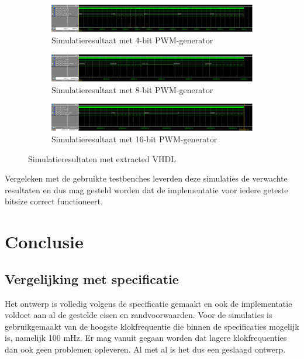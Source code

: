 \documentclass{article}
\begin{document}
\begin{figure}[H]
	\centering
	\begin{subfigure}{\textwidth}
		\includegraphics[width=\textwidth]{resource/pwm_gen_sim_4bit.png}
		\caption{Simulatieresultaat met 4-bit PWM-generator}
		\label{sfig:pwm-sim-4bit}
	\end{subfigure}
	\newline
	\begin{subfigure}{\textwidth}
		\includegraphics[width=\textwidth]{resource/pwm_gen_sim_8bit.png}
		\caption{Simulatieresultaat met 8-bit PWM-generator}
		\label{sfig:pwm-sim-8bit}
	\end{subfigure}
	\newline
	\begin{subfigure}{\textwidth}
		\includegraphics[width=\textwidth]{resource/pwm_gen_sim_16bit.png}
		\caption{Simulatieresultaat met 16-bit PWM-generator}
		\label{sfig:pwm-sim-16bit}
	\end{subfigure}
	\caption{Simulatieresultaten met extracted VHDL}
	\label{fig:pwm-sim}
\end{figure}

Vergeleken met de gebruikte testbenches leverden deze simulaties de verwachte resultaten en dus mag gesteld worden dat de implementatie voor iedere geteste bitsize correct functioneert.

\section{Conclusie}
\label{sec:pwm-conclusie}

\subsection{Vergelijking met specificatie}
\label{ssec:pwm-conclusie-spec-comp}
Het ontwerp is volledig volgens de specificatie gemaakt en ook de implementatie voldoet aan al de gestelde eisen en randvoorwaarden. Voor de simulaties is gebruikgemaakt van de hoogste klokfrequentie die binnen de specificaties mogelijk is, namelijk 100 mHz. Er mag vanuit gegaan worden dat lagere klokfrequenties dan ook geen problemen opleveren.
Al met al is het dus een geslaagd ontwerp.
\end{document}
